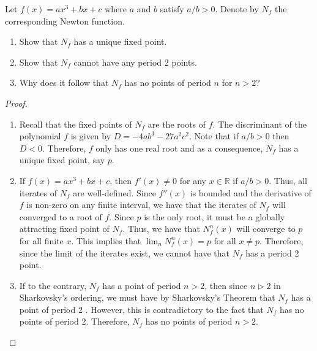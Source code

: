 \begin{problem}{6}
  Let $f(x) = ax^3+bx+c$ where $a$ and $b$ satisfy $a/b > 0$. Denote by $N_f$
  the corresponding Newton function.
  \begin{enumerate}
    \item Show that $N_f$ has a unique fixed point.
    \item Show that $N_f$ cannot have any period 2 points.
    \item Why does it follow that $N_f$ has no points of period $n$ for $n>2$?
  \end{enumerate}
\end{problem}

\begin{proof}
  \begin{enumerate}
    \item Recall that the fixed points of $N_f$ are the roots of $f$.
      The discriminant of the polynomial $f$ is given by $D = -4 ab^3 -27 a^2 c^2$. Note that
      if $a/b > 0$ then $D < 0$. Therefore, $f$ only has one real root
      and as a consequence, $N_f$ has a unique fixed point, say $p$.
    \item If $f(x) = ax^3+bx+c$, then $f'(x) \neq 0$ for any $x\in\mathbb{R}$ if $a/b > 0$.
      Thus, all iterates of $N_f$ are well-defined. Since $f''(x)$ is bounded and the derivative of $f$ is non-zero on any finite interval,
      we have that the iterates of $N_f$ will converged to a root of $f$. Since $p$ is the only root,
      it must be a globally attracting fixed point of $N_f$. Thus,
      we have that $N_f^n(x)$ will converge to $p$ for all finite $x$.
      This implies that $\lim_n N_f^n(x) = p$ for all $x\neq p$.
      Therefore, since the limit of the iterates exist, we cannot have that $N_f$ has a period 2 point.
    \item If to the contrary, $N_f$ has a point of period $n > 2$,
      then since $n \triangleright 2$ in Sharkovsky's ordering, we must have
      by Sharkovsky's Theorem that $N_f$ has a point of period 2 . However, this is
      contradictory to the fact that $N_f$ has no points of period 2. Therefore,
      $N_f$ has no points of period $n > 2$.
  \end{enumerate}
\end{proof}
\newpage
